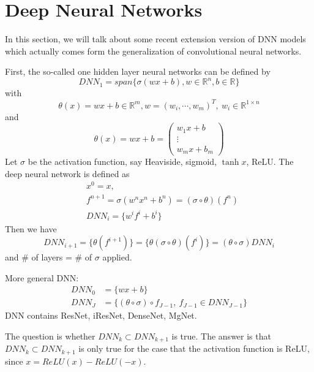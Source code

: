 \section{Deep Neural Networks}

In this section, we will talk about some recent extension version of DNN models which
actually comes form the generalization of convolutional neural networks.

First, the so-called one hidden layer neural networks can be defined by
\begin{equation}
DNN_1=span\{\sigma(wx+b), w\in\mathbb{R}^n ,b\in\mathbb{R} \}
\end{equation}
with
$$
\theta(x) = wx+b \in\mathbb{R}^m, w=(w_i,\cdots,w_m)^T,\ w_i\in\mathbb{R}^{1\times n}
$$	
and
\begin{equation*}
\theta(x) = 	wx+b=\left(\begin{array}{c}
		w_1x+b \\ 
		\vdots \\ 
		w_m x+b_m
	\end{array} 
	\right)
\end{equation*}
Let $\sigma$ be the activation function, say Heaviside, sigmoid, $\tanh x$, ReLU. The deep neural network is defined as 
\begin{equation*}
	\begin{aligned}
		&x^0 = x,\\
		&f^{n+1}=\sigma(w^n x^n+b^n)=(\sigma\circ\theta)(f^n)\\
		&DNN_i = \{w^i f^i +b^i \}
	\end{aligned}
\end{equation*}
Then we have
\begin{equation}
  \label{eq:1}
DNN_{i+1} = \{\theta(f^{i+1}) \}
=\{\theta(\sigma\circ\theta)(f^i) \}
=(\theta\circ\sigma) DNN_{i} 
\end{equation}
and $\#$ of layers = $\#$ of $\sigma$ applied.


More general DNN:
\begin{equation}
	\begin{aligned}
		DNN_0&=\{wx+b\}\\
		DNN_J&=\{(\theta\circ\sigma)\circ f_{J-1}, \ f_{J-1}\in DNN_{J-1}\}
	\end{aligned}
\end{equation}
DNN contains ResNet, iResNet, DenseNet, MgNet.

The question is whether $DNN_k\subset DNN_{k+1}$ is true. The answer is that $DNN_k\subset DNN_{k+1}$ is only true for the case that the activation function is ReLU, since $x=ReLU(x)-ReLU(-x)$.

